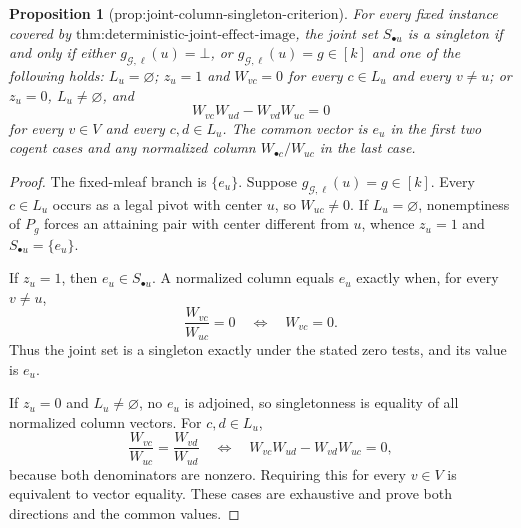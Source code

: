 \documentclass{article}
\newtheorem{proposition}{Proposition}
\begin{document}
\begin{proposition}[prop:joint-column-singleton-criterion]\label{prop:joint-column-singleton-criterion}
For every fixed instance covered by \(\text{thm:deterministic-joint-effect-image}\), the joint set \(S_{\bullet u}\) is a singleton if and only if either \(g_{\mathcal G,\ell}(u)=\bot\), or \(g_{\mathcal G,\ell}(u)=g\in[k]\) and one of the following holds: \(L_u=\varnothing\); \(z_u=1\) and \(W_{vc}=0\) for every \(c\in L_u\) and every \(v\ne u\); or \(z_u=0\), \(L_u\ne\varnothing\), and
\[
W_{vc}W_{ud}-W_{vd}W_{uc}=0
\]
for every \(v\in V\) and every \(c,d\in L_u\).  The common vector is \(e_u\) in the first two cogent cases and any normalized column \(W_{\bullet c}/W_{uc}\) in the last case.
\end{proposition}
\begin{proof}
The fixed-mleaf branch is \(\{e_u\}\). Suppose \(g_{\mathcal G,\ell}(u)=g\in[k]\). Every \(c\in L_u\) occurs as a legal pivot with center \(u\), so \(W_{uc}\ne0\). If \(L_u=\varnothing\), nonemptiness of \(P_g\) forces an attaining pair with center different from \(u\), whence \(z_u=1\) and \(S_{\bullet u}=\{e_u\}\).

If \(z_u=1\), then \(e_u\in S_{\bullet u}\). A normalized column equals \(e_u\) exactly when, for every \(v\ne u\),
\[
\frac{W_{vc}}{W_{uc}}=0\quad\Longleftrightarrow\quad W_{vc}=0.
\]
Thus the joint set is a singleton exactly under the stated zero tests, and its value is \(e_u\).

If \(z_u=0\) and \(L_u\ne\varnothing\), no \(e_u\) is adjoined, so singletonness is equality of all normalized column vectors. For \(c,d\in L_u\),
\[
\frac{W_{vc}}{W_{uc}}=\frac{W_{vd}}{W_{ud}}
\quad\Longleftrightarrow\quad
W_{vc}W_{ud}-W_{vd}W_{uc}=0,
\]
because both denominators are nonzero. Requiring this for every \(v\in V\) is equivalent to vector equality. These cases are exhaustive and prove both directions and the common values.
\end{proof}
\end{document}
